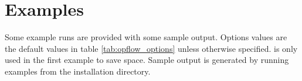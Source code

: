 \section{Examples}

Some \opflow example runs are provided with some sample output. Options values are the default values in table \ref{tab:opflow_options} unless otherwise specified.  is only used in the first example to save space. Sample output is generated by running examples from the installation directory.

\begin{comment}
Example using the \tao solver:

\begin{lstlisting}
$ ./bin/opflow -netfile case9mod.m -opflow_solver TAO -opflow_model \
POWER_BALANCE_CARTESIAN -print_output
[ExaGO INFO]: -- Checking ... -options_file not passed     exists: no
[ExaGO INFO]: Creating OPFlow
TAO solve converged due to CONVERGED_GRTOL iterations 12
=============================================================
                Optimal Power Flow
=============================================================
Model                               POWER_BALANCE_CARTESIAN
Solver                              TAO
Objective                           MIN_GEN_COST
Initialization                      MIDPOINT
Load loss allowed                   NO
Power imbalance allowed             NO
Ignore line flow constraints        NO

Number of variables                 24
Number of equality constraints      19
Number of inequality constraints    27

Convergence status                  CONVERGED
Objective value                     4144.46

----------------------------------------------------------------------
Bus        Pd      Qd      Vm      Va      mult_Pmis      mult_Qmis
----------------------------------------------------------------------
1         0.00    0.00   1.100  -0.000      2102.91         0.00
2         0.00    0.00   1.095   3.927      2059.18         0.00
3         0.00    0.00   1.087   2.120      2065.15        -0.00
4         0.00    0.00   1.097  -1.993      2103.16         0.08
5        75.00   50.00   1.079  -3.060      2113.46         7.29
6        90.00   30.00   1.087  -3.927      2129.85         1.62
7         0.00    0.00   1.100   0.535      2059.57        -0.04
8       100.00   35.00   1.089  -1.720      2079.34         2.99
9         0.00    0.00   1.100  -0.135      2065.43        -0.09


\end{comment}
